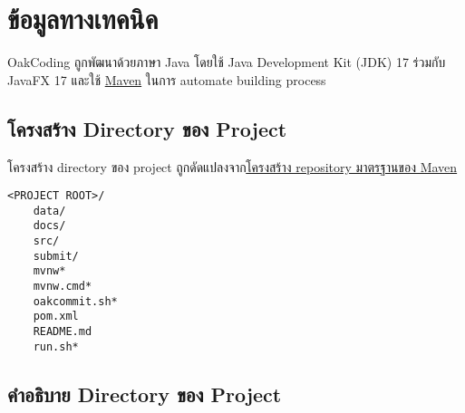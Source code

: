 \clearpage

\section*{ข้อมูลทางเทคนิค}

OakCoding ถูกพัฒนาด้วยภาษา Java โดยใช้ Java Development Kit (JDK) 17
\mbox{ร่วมกับ} JavaFX 17 และใช้ \href{https://maven.apache.org/}{Maven} ในการ automate building process

\rule{0em}{1ex}
\subsection*{โครงสร้าง Directory ของ Project}

โครงสร้าง directory ของ project ถูกดัดแปลงจาก\href{https://maven.apache.org/guides/introduction/introduction-to-the-standard-directory-layout.html}{โครงสร้าง repository มาตรฐานของ Maven}

\setlength{\parindent}{0em}
\setlength{\columnsep}{2pt}
\begin{lstlisting}[title={โครงสร้าง Directory ของ Project},numbers=none]
<PROJECT ROOT>/
    data/
    docs/
    src/
    submit/
    mvnw*
    mvnw.cmd*
    oakcommit.sh*
    pom.xml
    README.md
    run.sh*
\end{lstlisting}

\clearpage

\subsection*{คำอธิบาย Directory ของ Project}

